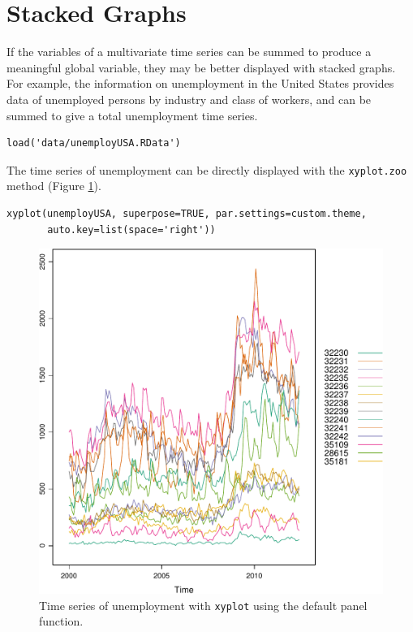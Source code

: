 \section{Stacked Graphs}
\label{sec-3}
If the variables of a multivariate time series can be summed to
produce a meaningful global variable, they may be better displayed
with stacked graphs. For example, the information on unemployment in
the United States provides data of unemployed persons by industry and
class of workers, and can be summed to give a total unemployment time
series.

\lstset{language=R,numbers=none}
\begin{lstlisting}
load('data/unemployUSA.RData')
\end{lstlisting}

The time series of unemployment can be directly displayed
with the \texttt{xyplot.zoo} method (Figure \ref{fig:unemployUSAxyplot}).

\lstset{language=R,numbers=none}
\begin{lstlisting}
xyplot(unemployUSA, superpose=TRUE, par.settings=custom.theme,
       auto.key=list(space='right'))
\end{lstlisting}

\begin{figure}[htb]
\centering
\includegraphics[width=.9\linewidth]{figs/unemployUSAxyplot.pdf}
\caption{\label{fig:unemployUSAxyplot}Time series of unemployment  with \texttt{xyplot} using the default panel function.}
\end{figure}

